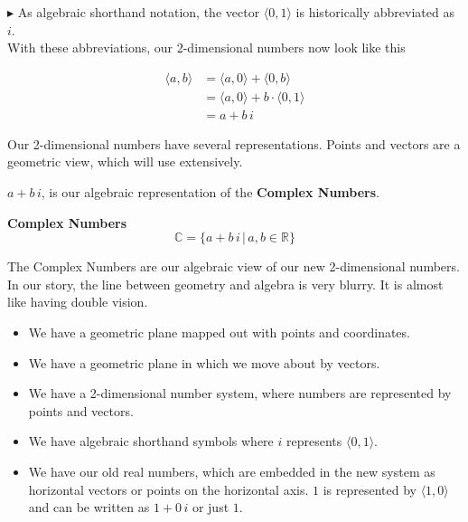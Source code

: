 \documentclass{ximera}
\begin{document}
$\blacktriangleright$  As algebraic shorthand notation, the vector $ \langle 0, 1 \rangle $ is historically abbreviated as $i$.  \\




With these abbreviations, our 2-dimensional numbers now look like this


\begin{align*}
\langle a, b \rangle & = \langle a, 0 \rangle + \langle 0, b \rangle  \\
         & = \langle a, 0 \rangle + b \cdot \langle 0, 1 \rangle  \\
          & = a + b \, i
\end{align*}




Our 2-dimensional numbers have several representations.  Points and vectors are a geometric view, which will use extensively.


 $a + b \, i$, is our algebraic representation of the \textbf{Complex Numbers}. \\







\begin{definition}  \textbf{\textcolor{green!50!black}{Complex Numbers}}  \\


\[   \mathbb{C}  = \{  a + b \, i   \, | \, a, b \in \mathbb{R}             \}               \]


\end{definition}













The Complex Numbers are our algebraic view of our new 2-dimensional numbers.  In our story, the line between geometry and algebra is very blurry. It is almost like having double vision.  


\begin{itemize}
\item We have a geometric plane mapped out with points and coordinates.
\item We have a geometric plane in which we move about by vectors.
\item We have a 2-dimensional number system, where numbers are represented by points and vectors.
\item We have algebraic shorthand symbols where $i$ represents $\langle 0, 1 \rangle$.
\item We have our old real numbers, which are embedded in the new system as horizontal vectors or points on the horizontal axis. $1$ is represented by $\langle 1, 0 \rangle$ and can be written as $1 + 0 \, i$ or just $1$.
\end{itemize}
\end{document}

